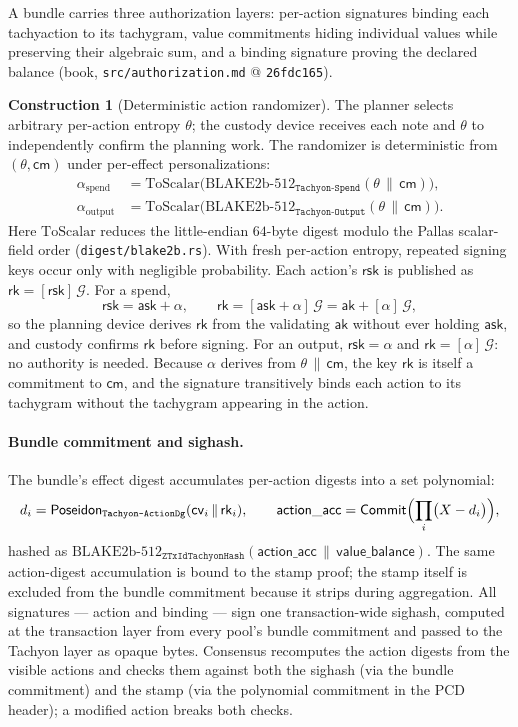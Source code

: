 \documentclass[11pt,a4paper]{article}
\theoremstyle{definition}
\newtheorem{construction}[theorem]{Construction}
\newcommand{\Comm}{\mathsf{Commit}}
\newcommand{\cmsym}{\mathsf{cm}}
\newcommand{\cvsym}{\mathsf{cv}}
\newcommand{\rk}{\mathsf{rk}}
\newcommand{\ask}{\ensuremath{\mathsf{ask}}}
\newcommand{\aksym}{\ensuremath{\mathsf{ak}}}
\newcommand{\rsk}{\ensuremath{\mathsf{rsk}}}
\begin{document}
A bundle carries three authorization layers: per-action signatures binding
each tachyaction to its tachygram, value commitments hiding individual
values while preserving their algebraic sum, and a binding signature
proving the declared balance (book, \texttt{src/authorization.md} @
\texttt{26fdc165}).

\begin{construction}[Deterministic action randomizer]
\label{def:tachyon-design-alpha}
The planner selects arbitrary per-action entropy $\theta$; the custody
device receives each note and $\theta$ to independently confirm the
planning work. The randomizer is deterministic from $(\theta, \cmsym)$
under per-effect personalizations:
\[
\begin{aligned}
\alpha_{\mathrm{spend}} &= \mathrm{ToScalar}\bigl(
  \text{BLAKE2b-512}_{\texttt{Tachyon-Spend}}(\theta \,\|\, \cmsym)\bigr),\\
\alpha_{\mathrm{output}} &= \mathrm{ToScalar}\bigl(
  \text{BLAKE2b-512}_{\texttt{Tachyon-Output}}(\theta \,\|\, \cmsym)\bigr).
\end{aligned}
\]
Here $\mathrm{ToScalar}$ reduces the little-endian $64$-byte digest
modulo the Pallas scalar-field order (\texttt{digest/blake2b.rs}).
With fresh per-action entropy, repeated signing keys occur only with
negligible probability. Each action's $\rsk$ is published as
$\rk = [\rsk]\,\mathcal{G}$. For a spend,
\[
\rsk = \ask + \alpha, \qquad
\rk = [\ask + \alpha]\,\mathcal{G} = \aksym + [\alpha]\,\mathcal{G},
\]
so the planning device derives $\rk$ from the validating $\aksym$ without
ever holding $\ask$, and custody confirms $\rk$ before signing. For an
output, $\rsk = \alpha$ and $\rk = [\alpha]\,\mathcal{G}$: no authority is
needed. Because $\alpha$ derives from $\theta \,\|\, \cmsym$, the key $\rk$
is itself a commitment to $\cmsym$, and the signature transitively binds
each action to its tachygram without the tachygram appearing in the action.
\end{construction}

\paragraph{Bundle commitment and sighash.} The bundle's effect digest
accumulates per-action digests into a set polynomial:
\[
d_i = \mathsf{Poseidon}_{\texttt{Tachyon-ActionDg}}
  (\cvsym_i \,\|\, \rk_i), \qquad
\mathsf{action\_acc} = \Comm\Bigl(\prod_i \bigl(X - d_i\bigr)\Bigr),
\]
hashed as $\text{BLAKE2b-512}_{\texttt{ZTxIdTachyonHash}}
(\mathsf{action\_acc} \,\|\, \mathsf{value\_balance})$. The same
action-digest accumulation is bound to the stamp proof; the stamp itself
is excluded from the bundle commitment because it strips during
aggregation. All signatures --- action and binding --- sign one
transaction-wide sighash, computed at the transaction layer from every
pool's bundle commitment and passed to the Tachyon layer as opaque bytes.
Consensus recomputes the action digests from the visible actions and
checks them against both the sighash (via the bundle commitment) and the
stamp (via the polynomial commitment in the PCD header); a modified action
breaks both checks.
\end{document}
